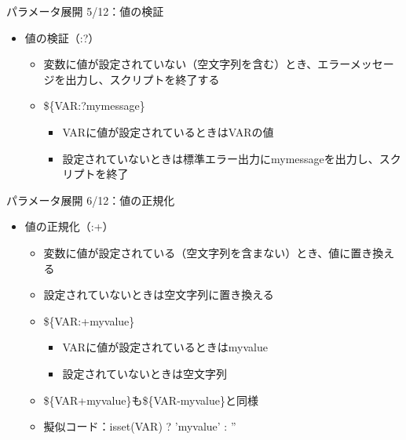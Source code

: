 \documentclass[12pt,aspectratio=169]{beamer}
\begin{document}
\begin{frame}{パラメータ展開 5/12：値の検証}

  \begin{itemize}
    \item 値の検証（:?）
      \begin{itemize}
        \item 変数に値が設定されていない（空文字列を含む）とき、エラーメッセージを出力し、スクリプトを終了する
        \item \$\{VAR:?mymessage\}
          \begin{itemize}
            \item VARに値が設定されているときはVARの値
            \item 設定されていないときは標準エラー出力にmymessageを出力し、スクリプトを終了
          \end{itemize}
      \end{itemize}

  \end{itemize}

\end{frame}


\begin{frame}{パラメータ展開 6/12：値の正規化}

  \begin{itemize}
    \item 値の正規化（:+）
      \begin{itemize}
        \item 変数に値が設定されている（空文字列を含まない）とき、値に置き換える
        \item 設定されていないときは空文字列に置き換える
        \item \$\{VAR:+myvalue\}
          \begin{itemize}
            \item VARに値が設定されているときはmyvalue
            \item 設定されていないときは空文字列
          \end{itemize}
        \item \$\{VAR+myvalue\}も\$\{VAR-myvalue\}と同様
        \item 擬似コード：isset(VAR) ? 'myvalue' : ''
      \end{itemize}

  \end{itemize}

\end{frame}
\end{document}
